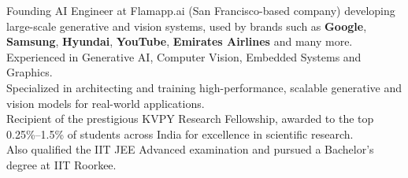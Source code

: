 

\begin{cvparagraph}

Founding AI Engineer at Flamapp.ai (San Francisco-based company) developing large-scale generative and 
vision systems,  
used by brands such as \textbf{Google}, \textbf{Samsung}, \textbf{Hyundai}, \textbf{YouTube}, \textbf{Emirates Airlines} and many more. 
Experienced in Generative AI, Computer Vision, Embedded Systems and Graphics.
\\
Specialized in architecting and training high-performance, scalable generative and vision models for real-world applications.\\
Recipient of the prestigious KVPY Research Fellowship, awarded to the top 0.25\%–1.5\% of students across India for excellence in scientific research.\\
Also qualified the IIT JEE Advanced examination and pursued a Bachelor’s degree at IIT Roorkee.\\
\end{cvparagraph}
